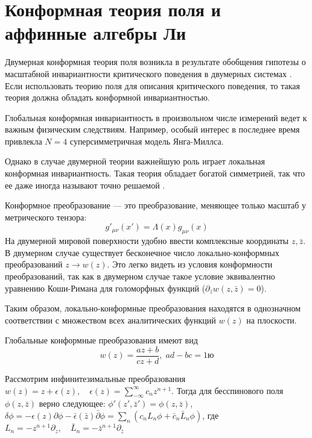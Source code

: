 

\chapter{Конформная теория поля и аффинные алгебры Ли}
\label{cha:CFT}

Двумерная конформная теория поля возникла в результате обобщения гипотезы о масштабной инвариантности критического поведения в двумерных системах \cite{Polyakov:1970xd}. Если использовать теорию поля для описания критического поведения, то такая теория должна обладать конформной инвариантностью. 

Глобальная конформная инвариантность в произвольном числе измерений ведет к важным физическим следствиям. Например, особый интерес в последнее время привлекла $N=4$ суперсимметричная модель Янга-Миллса.

 Однако в случае двумерной теории важнейшую роль играет локальная конформная инвариантность.  Такая теория обладает богатой симметрией, так что ее даже иногда называют точно решаемой \cite{belavin1984ics}.

Конформное преобразование --- это преобразование, меняющее только масштаб у метрического тензора:
\begin{equation}
  \label{eq:10}
  g'_{\mu\nu}(x')=\Lambda(x)g_{\mu\nu}(x)
\end{equation}
На двумерной мировой поверхности удобно ввести комплексные координаты $z,\bar{z}$. 
В двумерном случае существует бесконечное число локально-конформных преобразований $z\to w(z)$.
Это легко видеть из условия конформности преобразований, так как в двумерном случае такое
условие эквивалентно уравнению Коши-Римана для голоморфных функций ($\partial_{\bar z}w(z,\bar
z)=0$).

Таким образом, локально-конформные преобразования находятся в однозначном соответствии с множеством
всех аналитических функций $w(z)$ на плоскости.  

Глобальные конформные преобразования имеют вид
\begin{equation}
  \label{eq:172}
  w(z)=\frac{az+b}{cz+d},\; ad-bc=1ю
\end{equation}


Рассмотрим инфинитезимальные преобразования $w(z)=z+\epsilon(z),\quad \epsilon(z)=\sum_{-\infty}^{\infty}c_nz^{n+1}$. 
Тогда для бесспинового поля $\phi(z,\bar z)$ верно следующее: $\phi'(z',\bar z')=\phi(z,\bar z)$,
$\delta\phi=-\epsilon(z)\partial\phi-\bar \epsilon(\bar z)\bar \partial \phi=\sum_n(c_n L_n\phi+\bar
c_n\bar L_n\phi)$, где $L_n=-z^{n+1}\partial_z,\quad \bar L_n=-\bar z^{n+1}\partial_{\bar z}$

